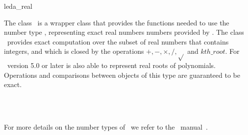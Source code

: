 \ccDefGlobalScope{}
\begin{ccRefClass}{leda_real}

\ccDefinition

The class \ccRefName\ is a wrapper class that provides the functions needed
to use the number type , representing exact real numbers
numbers provided by \leda. 
The class \ccRefName\ provides exact computation over the subset of real
numbers that contains integers, and which is closed by the operations
$+,-,\times,/,\sqrt{}$ and $kth\_root$. For \leda\ version 5.0 or later 
 is also able to represent real roots of polynomials. 
Operations and comparisons between objects of this type are guaranteed 
to be exact.


\ccIsModel
{}\\
\\

For more details on the number types of \leda\ we refer to the \leda\
manual~\cite{cgal:mnsu-lum}.

\end{ccRefClass}
